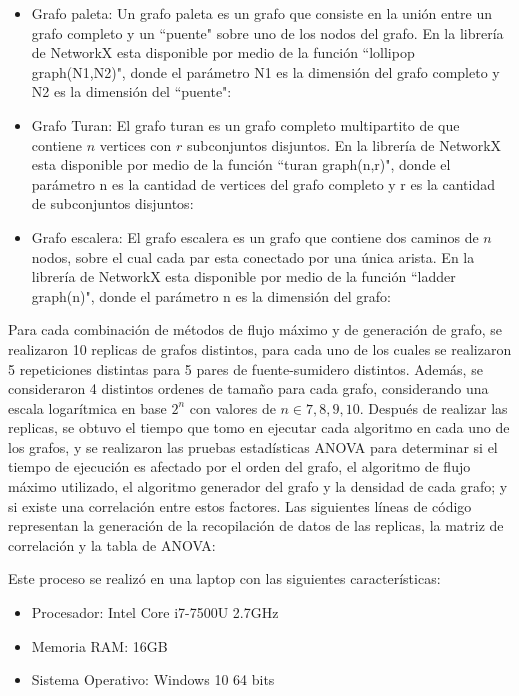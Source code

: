 \documentclass{article}
\begin{document}
\begin{itemize}
\item{Grafo paleta}: Un grafo paleta es un grafo que consiste en la unión entre un grafo completo y un ``puente" sobre uno de los nodos del grafo. En la librería de NetworkX esta disponible por medio de  la función ``lollipop graph(N1,N2)", donde el parámetro N1 es la dimensión del grafo completo y N2 es la dimensión del ``puente":

\item{Grafo Turan}:  El grafo turan es un grafo completo multipartito de que contiene $n$ vertices con $r$ subconjuntos disjuntos. En la librería de NetworkX esta disponible por medio de  la función ``turan graph(n,r)", donde el parámetro n es la cantidad de vertices del grafo completo y r es la cantidad de subconjuntos disjuntos:

\item{Grafo escalera}: El grafo escalera es un grafo que contiene dos caminos de $n$ nodos, sobre el cual cada par esta conectado por una única arista. En la librería de NetworkX esta disponible por medio de  la función ``ladder graph(n)", donde el parámetro n es la dimensión del grafo:

\end{itemize}
Para cada combinación de métodos de flujo máximo y de generación de grafo, se realizaron 10 replicas de grafos distintos, para cada uno de los cuales se realizaron 5 repeticiones distintas para 5 pares de fuente-sumidero distintos. Además, se consideraron 4 distintos ordenes de tamaño para cada grafo, considerando una escala logarítmica en base $2^n$ con valores de $n \in {7,8,9,10}$. Después de realizar las replicas, se obtuvo el tiempo que tomo en ejecutar cada algoritmo en cada uno de los grafos, y se realizaron las pruebas estadísticas ANOVA para determinar si el tiempo de ejecución es afectado por el orden del grafo, el algoritmo de flujo máximo utilizado, el algoritmo generador del grafo y la densidad de cada grafo; y si existe una correlación entre estos factores.
Las siguientes líneas de código representan la generación de la recopilación de datos de las replicas, la matriz de correlación y la tabla de ANOVA:


Este proceso se realizó en una laptop con las siguientes características:
\begin{itemize}
\item{Procesador}: Intel Core i7-7500U 2.7GHz
\item{Memoria RAM}: 16GB 
\item{Sistema Operativo}: Windows 10 64 bits
\end{itemize}
\end{document}
